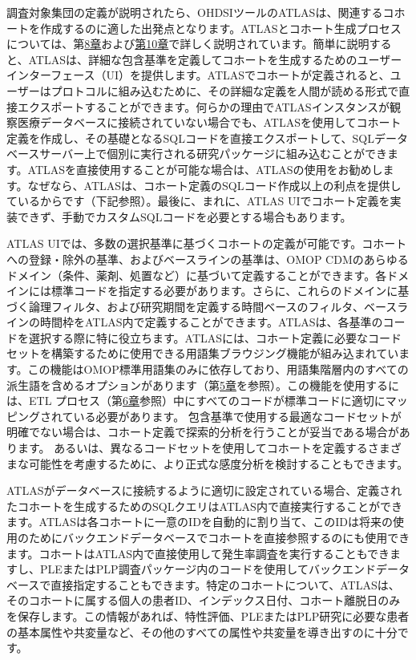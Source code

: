 \documentclass[
  11pt]{book}
\theoremstyle{definition}
\theoremstyle{definition}
\theoremstyle{definition}
\theoremstyle{definition}
\theoremstyle{remark}
\begin{document}
調査対象集団の定義が説明されたら、OHDSIツールのATLASは、関連するコホートを作成するのに適した出発点となります。ATLASとコホート生成プロセスについては、第\href{https://ohdsi.github.io/TheBookOfOhdsi/OhdsiAnalyticsTools.html\#OhdsiAnalyticsTools}{8章}および\href{https://ohdsi.github.io/TheBookOfOhdsi/Cohorts.html\#Cohorts}{第10章}で詳しく説明されています。簡単に説明すると、ATLASは、詳細な包含基準を定義してコホートを生成するためのユーザーインターフェース（UI）を提供します。ATLASでコホートが定義されると、ユーザーはプロトコルに組み込むために、その詳細な定義を人間が読める形式で直接エクスポートすることができます。何らかの理由でATLASインスタンスが観察医療データベースに接続されていない場合でも、ATLASを使用してコホート定義を作成し、その基礎となるSQLコードを直接エクスポートして、SQLデータベースサーバー上で個別に実行される研究パッケージに組み込むことができます。ATLASを直接使用することが可能な場合は、ATLASの使用をお勧めします。なぜなら、ATLASは、コホート定義のSQLコード作成以上の利点を提供しているからです（下記参照）。最後に、まれに、ATLAS UIでコホート定義を実装できず、手動でカスタムSQLコードを必要とする場合もあります。

ATLAS UIでは、多数の選択基準に基づくコホートの定義が可能です。コホートへの登録・除外の基準、およびベースラインの基準は、OMOP CDMのあらゆるドメイン（条件、薬剤、処置など）に基づいて定義することができます。各ドメインには標準コードを指定する必要があります。さらに、これらのドメインに基づく論理フィルタ、および研究期間を定義する時間ベースのフィルタ、ベースラインの時間枠をATLAS内で定義することができます。ATLASは、各基準のコードを選択する際に特に役立ちます。ATLASには、コホート定義に必要なコードセットを構築するために使用できる用語集ブラウジング機能が組み込まれています。この機能はOMOP標準用語集のみに依存しており、用語集階層内のすべての派生語を含めるオプションがあります（第\href{https://ohdsi.github.io/TheBookOfOhdsi/StandardizedVocabularies.html\#StandardizedVocabularies}{5章}を参照）。この機能を使用するには、ETL プロセス（第\href{https://ohdsi.github.io/TheBookOfOhdsi/ExtractTransformLoad.html\#ExtractTransformLoad}{6章}参照）中にすべてのコードが標準コードに適切にマッピングされている必要があります。 包含基準で使用する最適なコードセットが明確でない場合は、コホート定義で探索的分析を行うことが妥当である場合があります。 あるいは、異なるコードセットを使用してコホートを定義するさまざまな可能性を考慮するために、より正式な感度分析を検討することもできます。

ATLASがデータベースに接続するように適切に設定されている場合、定義されたコホートを生成するためのSQLクエリはATLAS内で直接実行することができます。ATLASは各コホートに一意のIDを自動的に割り当て、このIDは将来の使用のためにバックエンドデータベースでコホートを直接参照するのにも使用できます。コホートはATLAS内で直接使用して発生率調査を実行することもできますし、PLEまたはPLP調査パッケージ内のコードを使用してバックエンドデータベースで直接指定することもできます。特定のコホートについて、ATLASは、そのコホートに属する個人の患者ID、インデックス日付、コホート離脱日のみを保存します。この情報があれば、特性評価、PLEまたはPLP研究に必要な患者の基本属性や共変量など、その他のすべての属性や共変量を導き出すのに十分です。
\end{document}
